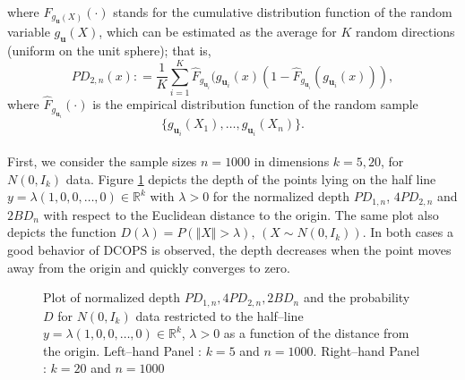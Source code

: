 \documentclass[a4paper]{article}
\def\defeq{\mathrel{\mathop:}=}
\numberwithin{equation}{section}
\def\defeq{\mathrel{\mathop:}=}
\begin{document}
where $F_{g_{\textbf{u}}(X)} (\cdot)$ stands for the cumulative distribution function of the random variable $g_{\textbf{u}}(X)$, which can be  estimated  as the average for $K$ random directions (uniform on the unit sphere); that is, 
$$PD_{2,n}(x) \defeq   \frac{1}{K} \sum_{i=1}^K \hat{F}_{g_{\textbf{u}_i}} (g_{\textbf{u}_i}(x)  \left(1-  \hat{F}_{g_{\textbf{u}_i}} (g_{\textbf{u}_i}(x))\right),$$
where $\hat{F}_{g_{\textbf{u}_i}}(\cdot)$ is the empirical distribution function of the random sample  $$\{g_{\textbf{u}_i}(X_1), \ldots, g_{\textbf{u}_i}(X_n) \}.$$
\\
First, we consider the sample sizes  $n=1000$ in dimensions $k=5,20$, for $N(0, I_k)$ data. 
Figure  \ref{prof_alta} depicts the depth of the points lying on the half line  $y=\lambda (1,0,0, \ldots,0) \in \mathbb{R}^k$ with $\lambda >0$ for the normalized depth $PD_{1,n}$, $4PD_{2,n}$ and $2BD_n$  with respect to the Euclidean distance to the origin. The same plot also depicts the function  $D(\lambda)= P(\Vert X \Vert >\lambda), \, \left( X \sim N(0,I_k) \right)$. In both cases a good behavior of DCOPS is observed, the depth decreases when the point moves away from the origin and quickly converges to zero.
 
 
\begin{figure}[!ht]
\centering
{}
\caption{Plot of normalized depth $PD_{1,n},4PD_{2,n}, 2BD_n$ 
and  the probability $D$ for $N(0,I_k)$ 
data restricted to the half--line   $y=\lambda (1,0,0, \ldots,0) \in \mathbb{R}^k$, $\lambda>0$ as a function of the distance from the origin. Left--hand Panel : $k=5$ and $n=1000$.  Right--hand Panel : $k=20$ and $n=1000$ }\label{prof_alta}  
\end{figure}
\end{document}
